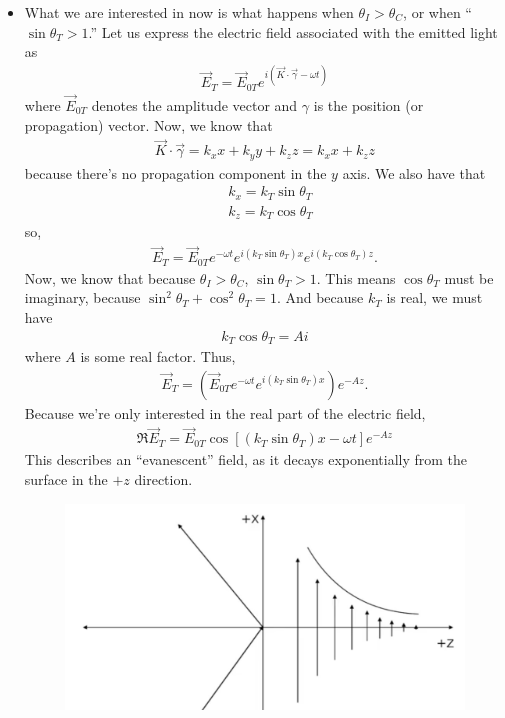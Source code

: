 \documentclass{report}
\theoremstyle{definition}
\newcommand{\lp}{\left(}
\newcommand{\rp}{\right)}
\newcommand{\lb}{\left[}
\newcommand{\rb}{\right]}
\begin{document}
\begin{itemize}
\begin{itemize}
		\item What we are interested in now is what happens when $\theta_I > \theta_C$, or when ``$\sin\theta_T > 1$.'' Let us express the electric field associated with the emitted light as
		\begin{align}
		\vec{E}_T = \vec{E}_{0T}e^{i(\vec{K}\cdot\vec{\gamma} - \omega t)}
		\end{align}
		where $\vec{E}_{0T}$ denotes the amplitude vector and $\gamma$ is the position (or propagation) vector. Now, we know that
		\begin{align}
		\vec{K}\cdot\vec{\gamma} = k_x x + k_y y + k_z z = k_x x + k_z z 
		\end{align}
		because there's no propagation component in the $y$ axis. We also have that
		\begin{align}
		&k_x = k_T \sin\theta_T\\
		&k_z = k_T \cos\theta_T
		\end{align}
		so,
		\begin{align}
		\vec{E}_T = \vec{E}_{0T}e^{-\omega t}e^{i(k_T\sin\theta_T)x}e^{i(k_T\cos\theta_T)z}.
		\end{align}
		Now, we know that because $\theta_I > \theta_C$, $\sin\theta_T > 1$. This means $\cos\theta_T$ must be imaginary, because $\sin^2\theta_T + \cos^2\theta_T = 1$. And because $k_T$ is real, we must have
		\begin{align}
		k_T\cos\theta_T = Ai
		\end{align}
		where $A$ is some real factor. Thus,
		\begin{align}
		\vec{E}_T = \lp\vec{E}_{0T}e^{-\omega t}e^{i(k_T\sin\theta_T)x}\rp e^{-Az}.
		\end{align}
		Because we're only interested in the real part of the electric field, 
		\begin{align}
		\boxed{\Re{\vec{E}_{T}} = \vec{E}_{0T}\cos\lb (k_T\sin\theta_T)x - \omega t \rb e^{-Az}}
		\end{align}
		This describes an ``evanescent'' field, as it decays exponentially from the surface in the $+z$ direction. 
		\begin{figure}[!htb]
			\centering
			\includegraphics[scale=0.5]{evanes}
		\end{figure}
	

\end{itemize}
\end{itemize}
\end{document}
